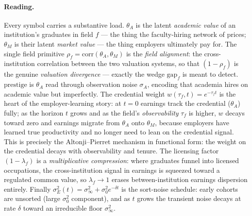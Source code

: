 \documentclass[11pt]{article}
\begin{document}
\paragraph{Reading.} Every symbol carries a substantive load. $\theta_A$ is the latent \emph{academic value} of an institution's graduates in field $f$ --- the thing the faculty-hiring network of \citet{wapman2022quantifying} prices; $\theta_M$ is their latent \emph{market value} --- the thing employers ultimately pay for. The single field primitive $\rho_f=\mathrm{corr}(\theta_A,\theta_M)$ is the \emph{field alignment}: the cross-institution correlation between the two valuation systems, so that $(1-\rho_f)$ is the genuine \emph{valuation divergence} --- exactly the wedge $\mathrm{gap}_f$ is meant to detect. $\mathrm{prestige}$ is $\theta_A$ read through observation noise $\sigma_A$, encoding that academia hires on academic value but imperfectly. The credential weight $w(\tau_f,t)=e^{-\tau_f t}$ is the heart of the employer-learning story: at $t=0$ earnings track the credential ($\theta_A$) fully; as the horizon $t$ grows and as the field's \emph{observability} $\tau_f$ is higher, $w$ decays toward zero and earnings migrate from $\theta_A$ onto $\theta_M$, because employers have learned true productivity and no longer need to lean on the credential signal. This is precisely the Altonji--Pierret mechanism \citep{altonji2001employer} in functional form: the weight on the credential decays with observability and tenure. The licensing factor $(1-\lambda_f)$ is a \emph{multiplicative compression}: where graduates funnel into licensed occupations, the cross-institution signal in earnings is squeezed toward a regulated common value, so $\lambda_f\to 1$ erases between-institution earnings dispersion entirely. Finally $\sigma_E^2(t)=\sigma_\infty^2+\sigma_0^2 e^{-\delta t}$ is the sort-noise schedule: early cohorts are unsorted (large $\sigma_0^2$ component), and as $t$ grows the transient noise decays at rate $\delta$ toward an irreducible floor $\sigma_\infty^2$.
\end{document}
